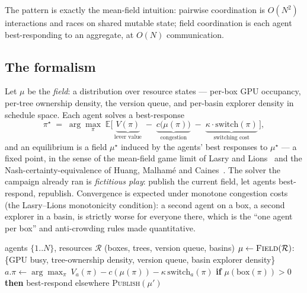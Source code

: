 \documentclass[11pt]{article}
\begin{document}
The pattern is exactly the mean-field intuition: pairwise coordination is $O(N^2)$ interactions and races on
shared mutable state; field coordination is each agent best-responding to an aggregate, at $O(N)$
communication.

\subsection{The formalism}
\label{sec:mf-formalism}

Let $\mu$ be the \emph{field}: a distribution over resource states --- per-box GPU occupancy, per-tree
ownership density, the version queue, and per-basin explorer density in schedule space. Each agent solves a
best-response
\[
\pi^\star \;=\; \arg\max_{\pi}\; \mathbb{E}\bigl[\, \underbrace{V(\pi)}_{\text{lever value}}
\;-\; \underbrace{c\bigl(\mu(\pi)\bigr)}_{\text{congestion}}
\;-\; \underbrace{\kappa\!\cdot\!\mathrm{switch}(\pi)}_{\text{switching cost}} \,\bigr],
\]
and an equilibrium is a field $\mu^\star$ induced by the agents' best responses to $\mu^\star$ --- a fixed
point, in the sense of the mean-field game limit of Lasry and Lions~\cite{lasrylions} and the Nash-certainty-equivalence
of Huang, Malhamé and Caines~\cite{hmc}. The solver the campaign already ran is \emph{fictitious play}:
publish the current field, let agents best-respond, republish. Convergence is expected under monotone
congestion costs (the Lasry--Lions monotonicity condition): a second agent on a box, a second explorer in a
basin, is strictly worse for everyone there, which is the ``one agent per box'' and anti-crowding rules made
quantitative.

\begin{algorithm}[h]
\caption{\textsc{MeanFieldFleetCoordinator} --- interact through the field, not pairwise}
\label{alg:mfc}
\begin{algorithmic}[1]
\Require agents $\{1..N\}$, resources $\mathcal{R}$ (boxes, trees, version queue, basins)
\Loop {}
  \State $\mu \gets \textsc{Field}(\mathcal{R})$: \{GPU busy, tree-ownership density, version queue, basin explorer density\}
   
     \State $a.\pi \gets \arg\max_{\pi}\ V_a(\pi) - c(\mu(\pi)) - \kappa\,\mathrm{switch}_a(\pi)$
     \State \textbf{if} $\mu(\text{box}(\pi)) > 0$ \textbf{then} best-respond elsewhere 
  \EndFor
  \State \textsc{Publish}$(\mu')$ 
\EndLoop
\end{algorithmic}
\end{algorithm}
\end{document}

